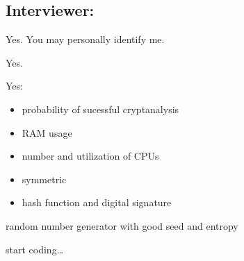 \subsection{Interviewer: \vp}


\begin{answer}{1}
Yes.
You may personally identify me.
\end{answer}


\begin{answer}{2}
Yes.
\end{answer}


\begin{answer}{3}
Yes:
\begin{itemize}
\item probability of sucessful cryptanalysis
\item RAM usage
\item number and utilization of CPUs
\end{itemize}
\end{answer}


\begin{answer}{4}
\begin{itemize}
\item symmetric \aes
\item hash function and digital signature
\end{itemize}
\end{answer}


\begin{answer}{5}
random number generator with good seed and entropy
\end{answer}


\begin{answer}{6}
start coding\ldots
\end{answer}


